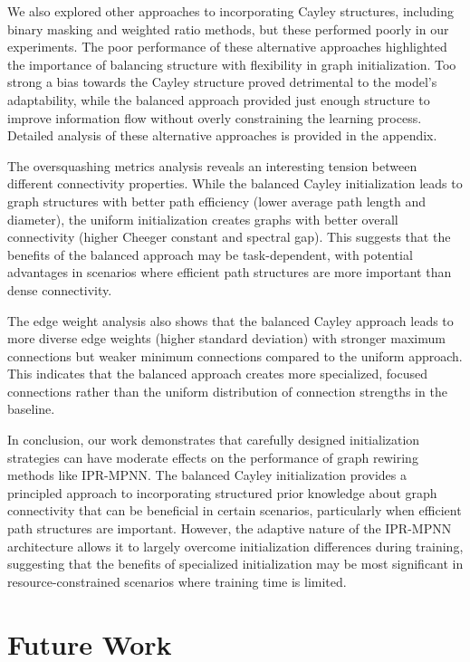 \documentclass[11pt,a4paper]{article}
\begin{document}
We also explored other approaches to incorporating Cayley structures, including binary masking and weighted ratio methods, but these performed poorly in our experiments. The poor performance of these alternative approaches highlighted the importance of balancing structure with flexibility in graph initialization. Too strong a bias towards the Cayley structure proved detrimental to the model's adaptability, while the balanced approach provided just enough structure to improve information flow without overly constraining the learning process. Detailed analysis of these alternative approaches is provided in the appendix.

The oversquashing metrics analysis reveals an interesting tension between different connectivity properties. While the balanced Cayley initialization leads to graph structures with better path efficiency (lower average path length and diameter), the uniform initialization creates graphs with better overall connectivity (higher Cheeger constant and spectral gap). This suggests that the benefits of the balanced approach may be task-dependent, with potential advantages in scenarios where efficient path structures are more important than dense connectivity.

The edge weight analysis also shows that the balanced Cayley approach leads to more diverse edge weights (higher standard deviation) with stronger maximum connections but weaker minimum connections compared to the uniform approach. This indicates that the balanced approach creates more specialized, focused connections rather than the uniform distribution of connection strengths in the baseline.

In conclusion, our work demonstrates that carefully designed initialization strategies can have moderate effects on the performance of graph rewiring methods like IPR-MPNN. The balanced Cayley initialization provides a principled approach to incorporating structured prior knowledge about graph connectivity that can be beneficial in certain scenarios, particularly when efficient path structures are important. However, the adaptive nature of the IPR-MPNN architecture allows it to largely overcome initialization differences during training, suggesting that the benefits of specialized initialization may be most significant in resource-constrained scenarios where training time is limited.

\section{Future Work}
\label{sec:future}
\end{document}

